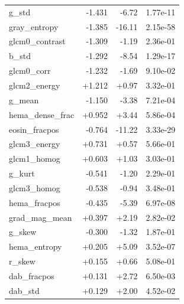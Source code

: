 \begin{longtable}{lrrr}
g\_std & -1.431 & -6.72 & 1.77e-11 \\
gray\_entropy & -1.385 & -16.11 & 2.15e-58 \\
glcm0\_contrast & -1.309 & -1.19 & 2.36e-01 \\
b\_std & -1.292 & -8.54 & 1.29e-17 \\
glcm0\_corr & -1.232 & -1.69 & 9.10e-02 \\
glcm2\_energy & +1.212 & +0.97 & 3.32e-01 \\
g\_mean & -1.150 & -3.38 & 7.21e-04 \\
hema\_dense\_frac & +0.952 & +3.44 & 5.86e-04 \\
eosin\_fracpos & -0.764 & -11.22 & 3.33e-29 \\
glcm3\_energy & +0.731 & +0.57 & 5.66e-01 \\
glcm1\_homog & +0.603 & +1.03 & 3.03e-01 \\
g\_kurt & -0.541 & -1.20 & 2.29e-01 \\
glcm3\_homog & -0.538 & -0.94 & 3.48e-01 \\
hema\_fracpos & -0.435 & -5.39 & 6.97e-08 \\
grad\_mag\_mean & +0.397 & +2.19 & 2.82e-02 \\
g\_skew & -0.300 & -1.32 & 1.87e-01 \\
hema\_entropy & +0.205 & +5.09 & 3.52e-07 \\
r\_skew & +0.155 & +0.66 & 5.08e-01 \\
dab\_fracpos & +0.131 & +2.72 & 6.50e-03 \\
dab\_std & +0.129 & +2.00 & 4.52e-02 \\
\bottomrule
\end{longtable}
